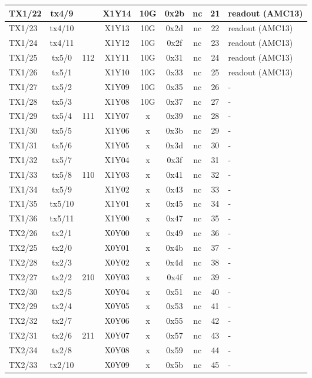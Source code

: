 \begin{longtable}{|l|c|c|c|c|c|c|c|l|}
TX1/22 & tx4/9  &     & X1Y14 & 10G & 0x2b & nc & 21 & readout (AMC13)\\\hline
TX1/23 & tx4/10 &     & X1Y13 & 10G & 0x2d & nc & 22 & readout (AMC13)\\\hline
TX1/24 & tx4/11 &     & X1Y12 & 10G & 0x2f & nc & 23 & readout (AMC13)\\\hline
TX1/25 & tx5/0  & 112 & X1Y11 & 10G & 0x31 & nc & 24 & readout (AMC13)\\\hline
TX1/26 & tx5/1  &     & X1Y10 & 10G & 0x33 & nc & 25 & readout (AMC13)\\\hline
TX1/27 & tx5/2  &     & X1Y09 & 10G & 0x35 & nc & 26 & -\\\hline
TX1/28 & tx5/3  &     & X1Y08 & 10G & 0x37 & nc & 27 & -\\\hline
TX1/29 & tx5/4  & 111 & X1Y07 &  x  & 0x39 & nc & 28 & -\\\hline
TX1/30 & tx5/5  &     & X1Y06 &  x  & 0x3b & nc & 29 & -\\\hline
TX1/31 & tx5/6  &     & X1Y05 &  x  & 0x3d & nc & 30 & -\\\hline
TX1/32 & tx5/7  &     & X1Y04 &  x  & 0x3f & nc & 31 & -\\\hline
TX1/33 & tx5/8  & 110 & X1Y03 &  x  & 0x41 & nc & 32 & -\\\hline
TX1/34 & tx5/9  &     & X1Y02 &  x  & 0x43 & nc & 33 & -\\\hline
TX1/35 & tx5/10 &     & X1Y01 &  x  & 0x45 & nc & 34 & -\\\hline
TX1/36 & tx5/11 &     & X1Y00 &  x  & 0x47 & nc & 35 & -\\\hline
TX2/26 & tx2/1  &     & X0Y00 &  x  & 0x49 & nc & 36 & -\\\hline
TX2/25 & tx2/0  &     & X0Y01 &  x  & 0x4b & nc & 37 & -\\\hline
TX2/28 & tx2/3  &     & X0Y02 &  x  & 0x4d & nc & 38 & -\\\hline
TX2/27 & tx2/2  & 210 & X0Y03 &  x  & 0x4f & nc & 39 & -\\\hline
TX2/30 & tx2/5  &     & X0Y04 &  x  & 0x51 & nc & 40 & -\\\hline
TX2/29 & tx2/4  &     & X0Y05 &  x  & 0x53 & nc & 41 & -\\\hline
TX2/32 & tx2/7  &     & X0Y06 &  x  & 0x55 & nc & 42 & -\\\hline
TX2/31 & tx2/6  & 211 & X0Y07 &  x  & 0x57 & nc & 43 & -\\\hline
TX2/34 & tx2/8  &     & X0Y08 &  x  & 0x59 & nc & 44 & -\\\hline
TX2/33 & tx2/10 &     & X0Y09 &  x  & 0x5b & nc & 45 & -\\\hline

\end{longtable}
